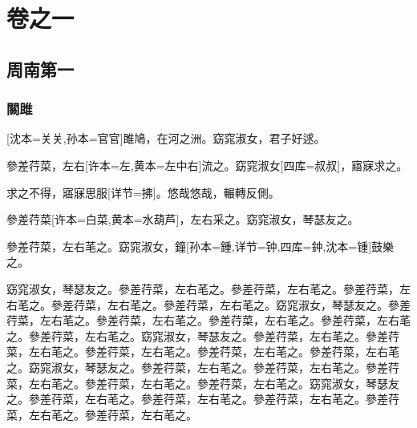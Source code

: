 \documentclass{ctexbook}
\makeatletter
\newcommand{\banbenzhuce}[1]{}
\newcommand{\banben}[2][]{#2}
\newenvironment{diben}[1]
  {\list{}{\listparindent 2em
    \itemindent\listparindent
    \rightmargin 0em  %
    \leftmargin 0em  %
    \parsep \z@ \@plus\p@}%
   \item\relax}
  {\endlist}
\makeatother
\begin{document}
\banbenzhuce{许本,黄本,四库,孙本,沈本,详节}

\chapter{卷之一}

\section{周南第一}

\subsection{關雎}

\begin{diben}
\banben{關關}[沈本={关关},孙本={官官}]雎鳩，在河之洲。窈窕淑女，君子好逑。

參差荇菜，\banben{左右}[许本={左},黄本={左中右}]流之。窈窕\banben{淑女}[四库={叔叔}]，寤寐求之。

求之不得，寤寐思\banben{服}[详节={拂}]。悠哉悠哉，輾轉反側。

參差\banben{荇菜}[许本={白菜},黄本={水葫芦}]，左右采之。窈窕淑女，琴瑟友之。

參差荇菜，左右芼之。窈窕淑女，\banben{鐘}[孙本={鍾},详节={钟},四库={鈡},沈本={锺}]鼓樂之。

\printyiwenlist
\end{diben}

窈窕淑女，琴瑟友之。參差荇菜，左右芼之。參差荇菜，左右芼之。參差荇菜，左右芼之。參差荇菜，左右芼之。參差荇菜，左右芼之。窈窕淑女，琴瑟友之。參差荇菜，左右芼之。參差荇菜，左右芼之。參差荇菜，左右芼之。參差荇菜，左右芼之。參差荇菜，左右芼之。窈窕淑女，琴瑟友之。參差荇菜，左右芼之。參差荇菜，左右芼之。參差荇菜，左右芼之。參差荇菜，左右芼之。參差荇菜，左右芼之。窈窕淑女，琴瑟友之。參差荇菜，左右芼之。參差荇菜，左右芼之。參差荇菜，左右芼之。參差荇菜，左右芼之。參差荇菜，左右芼之。窈窕淑女，琴瑟友之。參差荇菜，左右芼之。參差荇菜，左右芼之。參差荇菜，左右芼之。參差荇菜，左右芼之。參差荇菜，左右芼之。
\end{document}
